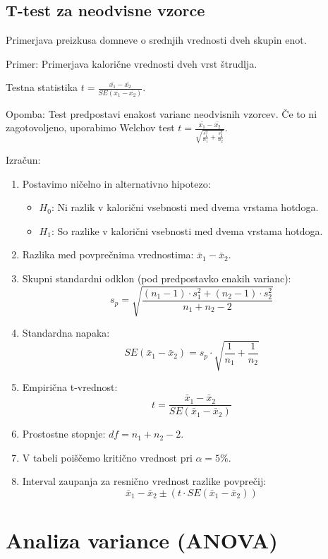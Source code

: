 \subsection{T-test za neodvisne vzorce}

Primerjava preizkusa domneve o srednjih vrednosti dveh skupin enot.

Primer: Primerjava kalorične vrednosti dveh vrst štrudlja.

Testna statistika $t = \frac{\bar{x_1}-\bar{x_2}}{SE(\bar{x_1}-\bar{x_2})}$.

Opomba: Test predpostavi enakost varianc neodvisnih vzorcev. Če to ni zagotovoljeno, uporabimo Welchov test $t = \frac{\bar{x_1}-\bar{x_2}}{\sqrt{\frac{s_1^2}{n_1}+\frac{s_2^2}{n_2}}}$.

Izračun:
\begin{enumerate}
    \item Postavimo ničelno in alternativno hipotezo:
        \begin{itemize}
            \item $H_0$: Ni razlik v kalorični vsebnosti med dvema vrstama hotdoga.
            \item $H_1$: So razlike v kalorični vsebnosti med dvema vrstama hotdoga.
        \end{itemize}
    \item Razlika med povprečnima vrednostima: $\bar{x}_1 - \bar{x}_2$.
    \item Skupni standardni odklon (pod predpostavko enakih varianc):
        \[s_p = \sqrt{\frac{(n_1 - 1) \cdot s_1^2 + (n_2 - 1) \cdot s_2^2}{n_1 + n_2 - 2}}\]
    \item Standardna napaka: 
        \[SE(\bar{x}_1 - \bar{x}_2) = s_p \cdot \sqrt{\frac{1}{n_1} + \frac{1}{n_2}}\]
    \item Empirična t-vrednost: 
        \[t = \frac{\bar{x}_1 - \bar{x}_2}{SE(\bar{x}_1 - \bar{x}_2)}\]
    \item Prostostne stopnje: $df = n_1 + n_2 - 2$.
    \item V tabeli poiščemo kritično vrednost pri $\alpha = 5\%$.
    \item Interval zaupanja za resnično vrednost razlike povprečij: 
        \[\bar{x}_1 - \bar{x}_2 \pm (t \cdot SE(\bar{x}_1 - \bar{x}_2))\]
\end{enumerate}

\section{Analiza variance (ANOVA)}

